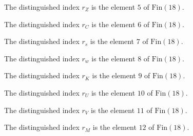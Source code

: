 \begin{definition}
\label{Complexity.LogProg.SavitchARM.rZ}
\leanok
The distinguished index $r_Z$ is the element $5$ of $\mathrm{Fin}(18)$.
\end{definition}

\begin{definition}
\label{Complexity.LogProg.SavitchARM.rC}
\leanok
The distinguished index $r_C$ is the element $6$ of $\mathrm{Fin}(18)$.
\end{definition}

\begin{definition}
\label{Complexity.LogProg.SavitchARM.rs}
\leanok
The distinguished index $r_s$ is the element $7$ of $\mathrm{Fin}(18)$.
\end{definition}

\begin{definition}
\label{Complexity.LogProg.SavitchARM.rw}
\leanok
The distinguished index $r_w$ is the element $8$ of $\mathrm{Fin}(18)$.
\end{definition}

\begin{definition}
\label{Complexity.LogProg.SavitchARM.rK}
\leanok
The distinguished index $r_K$ is the element $9$ of $\mathrm{Fin}(18)$.
\end{definition}

\begin{definition}
\label{Complexity.LogProg.SavitchARM.rU}
\leanok
The distinguished index $r_U$ is the element $10$ of $\mathrm{Fin}(18)$.
\end{definition}

\begin{definition}
\label{Complexity.LogProg.SavitchARM.rV}
\leanok
The distinguished index $r_V$ is the element $11$ of $\mathrm{Fin}(18)$.
\end{definition}

\begin{definition}
\label{Complexity.LogProg.SavitchARM.rM}
\leanok
The distinguished index $r_M$ is the element $12$ of $\mathrm{Fin}(18)$.
\end{definition}

